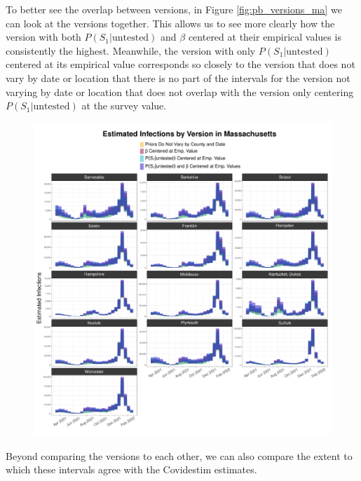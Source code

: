 \documentclass[12pt,twoside]{smiththesis}
\begin{document}
To better see the overlap between versions, in Figure \ref{fig:pb_versions_ma} we can look at the versions together. This allows us to see more clearly how the version with both \(P(S_1|\text{untested})\) and \(\beta\) centered at their empirical values is consistently the highest. Meanwhile, the version with only \(P(S_1|\text{untested})\) centered at its empirical value corresponds so closely to the version that does not vary by date or location that there is no part of the intervals for the version not varying by date or location that does not overlap with the version only centering \(P(S_1|\text{untested})\) at the survey value.
\begin{figure}
\includegraphics[width=1\linewidth]{figure/ma_pb_compare_versions} \caption{\label{fig:pb_versions_ma}}\label{fig:unnamed-chunk-19}
\end{figure}
Beyond comparing the versions to each other, we can also compare the extent to which these intervals agree with the Covidestim estimates.
\end{document}
